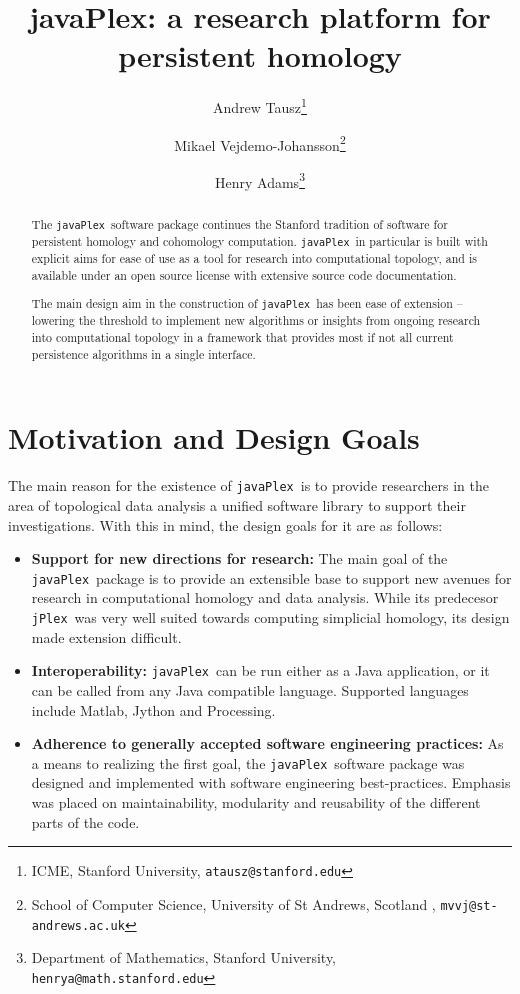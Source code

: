 \documentclass{gts2012}
\title{javaPlex: a research platform for persistent homology}
\author{Andrew Tausz\thanks{ICME,
        Stanford University, {\tt atausz@stanford.edu}}
        \and
        Mikael Vejdemo-Johansson\thanks{School of Computer Science, University of St Andrews, Scotland
          , {\tt mvvj@st-andrews.ac.uk}}
        \and Henry Adams\thanks{Department of Mathematics,
        Stanford University, {\tt henrya@math.stanford.edu}}
        }
\newcommand\jPlex{\texttt{jPlex}\ }
\newcommand\javaPlex{\texttt{javaPlex}\ }
\begin{document}
\maketitle

\begin{abstract}
The \javaPlex software package continues the Stanford tradition of software for persistent homology and cohomology computation. \javaPlex in particular is built with explicit aims for ease of use as a tool for research into computational topology, and is available under an open source license  with extensive source code documentation.

The main design aim in the construction of \javaPlex has been ease of extension -- lowering the threshold to implement new algorithms or insights from ongoing research into computational topology in a framework that provides most if not all current persistence algorithms in a single interface.

\end{abstract}

\section{Motivation and Design Goals}

The main reason for the existence of \javaPlex is to provide researchers in the area of topological data analysis a unified software library to support their investigations. With this in mind, the design goals for it are as follows:

\begin{itemize}
\item {\bf Support for new directions for research: } The main goal of the \javaPlex package is to provide an extensible base to support new avenues for research in computational homology and data analysis. While its predecesor \jPlex was very well suited towards computing simplicial homology, its design made extension difficult.
\item {\bf Interoperability: } \javaPlex can be run either as a Java application, or it can be called from any Java compatible language. Supported languages include Matlab, Jython and Processing.
\item {\bf Adherence to generally accepted software engineering practices: } As a means to realizing the first goal, the \javaPlex software package was designed and implemented with software engineering best-practices. Emphasis was placed on maintainability, modularity and reusability of the different parts of the code.
\end{itemize}
\end{document}
